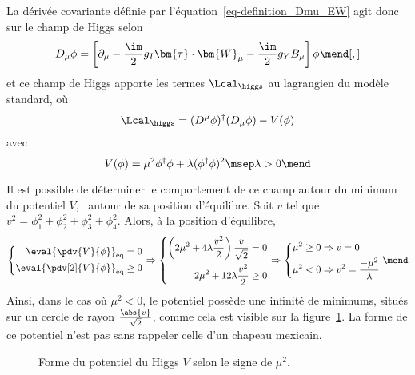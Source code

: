 \par La dérivée covariante définie par l'équation~\eqref{eq-definition_Dmu_EW} agit donc sur le champ de Higgs selon
\begin{equation}
D_\mu \phi = \left[ \partial_\mu - \frac{\im}{2}g_I \bm{\tau}\cdot\bm{W}_\mu - \frac{\im}{2}g_YB_\mu \right] \phi
\mend[,]
\end{equation}
et ce champ de Higgs apporte les termes $\Lcal_{\higgs}$ au lagrangien du modèle standard, où
\begin{equation}
\Lcal_{\higgs} = (D^\mu\phi)^\dagger(D_\mu\phi) - V(\phi)
\end{equation}
avec
\begin{equation}
V(\phi)
= \mu^2\phi^\dagger\phi + \lambda (\phi^\dagger\phi)^2
\msep \lambda > 0
\mend
\label{eq-chapter-MS-MSSM-section-formalisme-subsec-Higgs_mechanism-SM_Higgs_potential}
\end{equation}
\par Il est possible de déterminer le comportement de ce champ autour du minimum du potentiel $V$, \ie\ autour de sa position d'équilibre.
Soit $v$ tel que $v^2=\phi_1^2+\phi_2^2+\phi_3^2+\phi_4^2$.
Alors, à la position d'équilibre,
\begin{equation}
\left\lbrace
\begin{aligned}
\eval{\pdv{V}{\phi}}_\text{éq}=0
\\
\eval{\pdv[2]{V}{\phi}}_\text{éq}\geq0
\end{aligned}
\right.
\Rightarrow
\left\lbrace
\begin{aligned}
\left(2\mu^2 + 4\lambda \frac{v^2}{2}\right) \frac{v}{\sqrt{2}} = 0
\\
2\mu^2 + 12\lambda \frac{v^2}{2} \geq0
\end{aligned}
\right.
\Rightarrow
\left\lbrace
\begin{aligned}
\mu^2 \geq 0 &\Rightarrow v = 0
\\
\mu^2 < 0 &\Rightarrow v^2 = \frac{-\mu^2}{\lambda}
\end{aligned}
\right.
\mend
\end{equation}
Ainsi, dans le cas où $\mu^2<0$, le potentiel possède une infinité de minimums, situés sur un cercle de rayon $\frac{\abs{v}}{\sqrt{2}}$, comme cela est visible sur la figure~\ref{fig-rpztation_3d_V_Higgs}. La forme de ce potentiel n'est pas sans rappeler celle d'un chapeau mexicain.
\begin{figure}[h]
\centering

\caption{Forme du potentiel du Higgs $V$ selon le signe de $\mu^2$.}
\label{fig-rpztation_3d_V_Higgs}
\end{figure}
